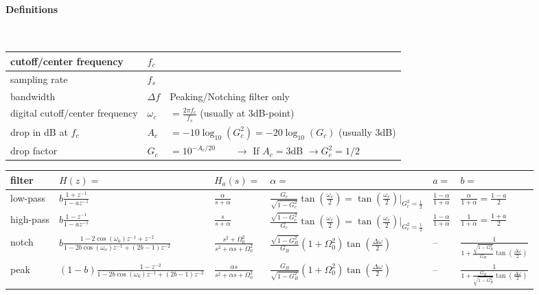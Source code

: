\paragraph{Definitions}~\\
\begin{tabular}{|l|l|l|}
	\hline
	cutoff/center frequency & $f_c$ &
	\\ \hline
	sampling rate & $f_s$ &
	\\ \hline
	bandwidth & $\Delta f$ & Peaking/Notching filter only
	\\ \hline
	digital cutoff/center frequency & $\omega_c$ & $ = \frac{2\pi f_c}{f_s}$ \qquad (usually at 3dB-point)
	\\ \hline
	drop in dB at $f_c$ & $A_c$ & $= -10\log_{10}(G_c^2) = -20\log_{10}(G_c)$ \qquad (usually 3dB)
	\\ \hline
	drop factor & $G_c$ & $=10^{-A_c/20} \qquad \longrightarrow $ If $A_c = 3$dB $\rightarrow G_c^2 = 1/2$
	\\ \hline
\end{tabular}
\vfill
\begin{tabularx}{\textwidth}{|X|l|l|l|l|l|}
	\hline
	\textbf{filter} & $H(z) = $ & $H_a(s) = $ & $\alpha = $ & $a=$ & $b=$
	\\ \hline
	low-pass	&
	$b\frac{1 + z^{-1}}{1 - a z^{-1}}$ &
	$\frac{\alpha}{s + \alpha}$	&
	$ \frac{G_c}{\sqrt{1-G_c^2}}\tan\left(\frac{\omega_c}{2}\right)
	= \tan\left(\frac{\omega_c}{2}\right)\vert_{G_c^2 = \frac{1}{2}}$&
	$\frac{1 - \alpha}{1 + \alpha}$ &
	$\frac{\alpha}{1 + \alpha} = \frac{1 - a}{2}$
	\\ \hline
	high-pass &
	$b\frac{1 - z^{-1}}{1 - a z^{-1}}$ &
	$\frac{s}{s + \alpha}$ &
	$\frac{\sqrt{1-G_c^2}}{G_c}\tan\left(\frac{\omega_c}{2}\right)
	=\tan\left(\frac{\omega_c}{2}\right)\vert_{G_c^2 = \frac{1}{2}}$&
	$\frac{1-\alpha}{1+\alpha}$&
	$\frac{1}{1+\alpha} = \frac{1 + a}{2}$
	\\ \hline
	notch &
	$b\frac{1-2\cos(\omega_0) z^{-1} + z^{-2}}{1 -2b \cos(\omega_o) z^{-1} + (2b-1)z^{-2}}$&
	$\frac{s^2 + \Omega_0^2}{s^2+\alpha s + \Omega_0^2}$&
	$\frac{\sqrt{1-G_B^2}}{G_B}(1+\Omega_0^2)\tan\left(\frac{\Delta\omega}{2}\right)$&
	--&
	$\frac{1}{1+\frac{\sqrt{1-G_B^2}}{G_B}\tan\left(\frac{\Delta\omega}{2}\right)}$
	\\ \hline
	peak &
	$(1-b)\frac{1-z^{-2}}{1-2b\cos(\omega_0)z^{-1} + (2b-1)z^{-2}}$&
	$\frac{\alpha s}{s^2 + \alpha s + \Omega_0^2}$&
	$\frac{G_B}{\sqrt{1-G_B^2}}(1+\Omega_0^2)\tan\left(\frac{\Delta\omega}{2}\right)$&
	--&
	$\frac{1}{1+\frac{G_B}{\sqrt{1-G_B^2}}\tan\left(\frac{\Delta\omega}{2}\right)}$
	\\ \hline
\end{tabularx}

